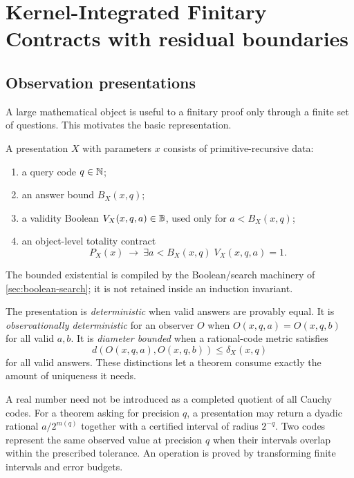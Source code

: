 \section{Kernel-Integrated Finitary Contracts with residual boundaries}\label{sec:contracts}

\subsection{Observation presentations}

A large mathematical object is useful to a finitary proof only through a finite set of questions.  This motivates the basic representation.

\begin{definition}
A presentation \(X\) with parameters \(x\) consists of primitive-recursive data:
\begin{enumerate}[label=(\roman*)]
  \item a query code \(q\in\mathbb N\);
  \item an answer bound \(B_X(x,q)\);
  \item a validity Boolean \(V_X(x,q,a)\in\mathbb B\), used only for \(a<B_X(x,q)\);
  \item an object-level totality contract
  \[
     P_X(x)\ \longrightarrow\ \exists a<B_X(x,q)\;V_X(x,q,a)=1.
  \]
\end{enumerate}
The bounded existential is compiled by the Boolean/search machinery of \cref{sec:boolean-search}; it is not retained inside an induction invariant.
\end{definition}

The presentation is \emph{deterministic} when valid answers are provably equal.  It is \emph{observationally deterministic} for an observer \(O\) when \(O(x,q,a)=O(x,q,b)\) for all valid \(a,b\).  It is \emph{diameter bounded} when a rational-code metric satisfies
\[
 d(O(x,q,a),O(x,q,b))\leq \delta_X(x,q)
\]
for all valid answers.  These distinctions let a theorem consume exactly the amount of uniqueness it needs.

\begin{example}
A real number need not be introduced as a completed quotient of all Cauchy codes.  For a theorem asking for precision \(q\), a presentation may return a dyadic rational \(a/2^{m(q)}\) together with a certified interval of radius \(2^{-q}\).  Two codes represent the same observed value at precision \(q\) when their intervals overlap within the prescribed tolerance.  An operation is proved by transforming finite intervals and error budgets.
\end{example}

